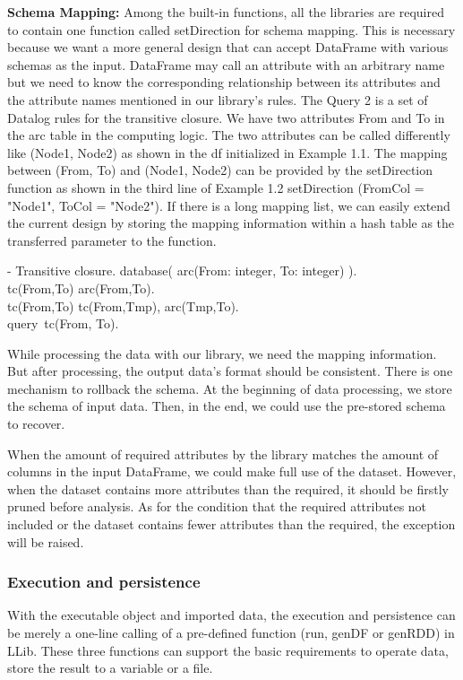 \textbf{Schema Mapping: }Among the built-in functions,  all the libraries are required to contain one function called setDirection for schema mapping. This is necessary because we want a more general design that can accept   DataFrame with various schemas as the input.  DataFrame may call an attribute with an arbitrary name but we need to know the corresponding relationship between its attributes and the attribute names mentioned in our library's rules. The Query 2 is a set of Datalog rules for the transitive closure. We have two attributes  From and To in the arc table in the computing logic. The two attributes can be called differently like (Node1, Node2) as shown in the df initialized in Example 1.1. The mapping between (From, To) and (Node1, Node2) can be provided by the setDirection function as shown in the third line of Example 1.2 setDirection (FromCol = "Node1", ToCol = "Node2"). If there is a long mapping list, we can easily extend the current design by  storing the mapping information within a hash table as the transferred parameter to the function.

\vspace{0.5em}
 - Transitive closure.
\bldl
database({
	arc(From: integer, To: integer)
}).\\


tc(From,To) \leftarrow arc(From,To).\\
tc(From,To) \leftarrow tc(From,Tmp), arc(Tmp,To). \\
query\ tc(From, To).
\eldl

While processing the data with our library, we need the mapping information. But after processing, the output data's format should be consistent. There is one mechanism to rollback the schema. At the beginning of data processing, we store the schema of input data. Then, in the end, we could use the pre-stored schema to recover. 

When the amount of required attributes by the library matches the amount of columns in the input DataFrame, we could  make full use of the dataset. However, when the dataset contains more attributes than the required, it should be firstly pruned before analysis. As for the condition that the required attributes not included or the dataset contains fewer attributes than  the required, the exception will be raised.



\subsubsection{Execution and persistence}
With the executable object and imported data, the execution and persistence can be merely a one-line calling of a pre-defined function (run, genDF or genRDD) in LLib. These three functions can support the basic requirements to operate data, store the result to a variable or a file. 

